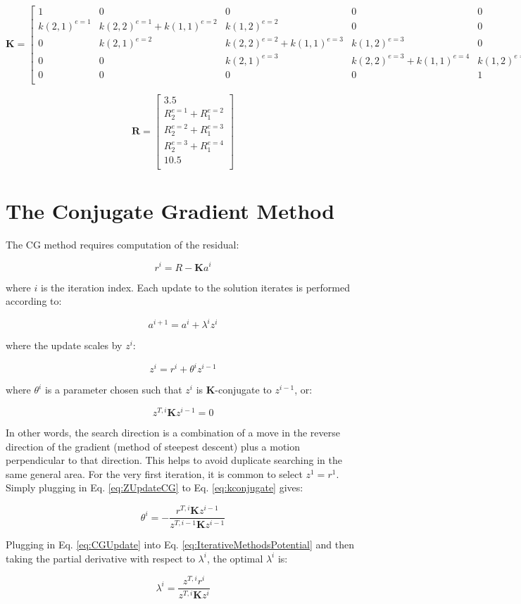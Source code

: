 \documentclass[10pt]{article}
\newcommand{\beq}{\begin{equation}}
\newcommand{\eeq}{\end{equation}}
\begin{document}
\beq
\textbf{K}=
\begin{bmatrix}
1 & 0 & 0 & 0 & 0\\
k(2, 1)^{e=1} & k(2, 2)^{e=1}+k(1, 1)^{e=2} & k(1, 2)^{e=2} & 0 & 0\\
0 & k(2, 1)^{e=2} & k(2, 2)^{e=2}+k(1, 1)^{e=3} & k(1, 2)^{e=3} & 0\\
0 & 0 & k(2, 1)^{e=3} & k(2, 2)^{e=3}+k(1, 1)^{e=4} & k(1, 2)^{e=4}\\
0 & 0 & 0 & 0 & 1\\
\end{bmatrix}
\eeq

\beq
\textbf{R}=\begin{bmatrix}
3.5\\ R_2^{e=1}+R_1^{e=2}\\R_2^{e=2}+R_1^{e=3}\\R_2^{e=3}+R_1^{e=4}\\10.5\\
\end{bmatrix}
\eeq

\section{The Conjugate Gradient Method}
The CG method requires computation of the residual:

\beq
r^i=R-\textbf{K}a^i
\eeq

where \(i\) is the iteration index. Each update to the solution iterates is performed according to:

\beq
\label{eq:CGUpdate}
a^{i+1}=a^i+\lambda^iz^i
\eeq

where the update scales by \(z^i\):

\beq
\label{eq:ZUpdateCG}
z^i=r^i+\theta^iz^{i-1}
\eeq

where \(\theta^i\) is a parameter chosen such that \(z^i\) is \(\textbf{K}\)-conjugate to \(z^{i-1}\), or:

\beq
\label{eq:kconjugate}
z^{T,i}\textbf{K}z^{i-1}=0
\eeq

In other words, the search direction is a combination of a move in the reverse direction of the gradient (method of steepest descent) plus a motion perpendicular to that direction. This helps to avoid duplicate searching in the same general area. For the very first iteration, it is common to select \(z^1=r^1\). Simply plugging in Eq. \eqref{eq:ZUpdateCG} to Eq. \eqref{eq:kconjugate} gives:

\beq
\theta^i=-\frac{r^{T,i}\textbf{K}z^{i-1}}{z^{T,i-1}\textbf{K}z^{i-1}}
\eeq

Plugging in Eq. \eqref{eq:CGUpdate} into Eq. \eqref{eq:IterativeMethodsPotential} and then taking the partial derivative with respect to \(\lambda^i\), the optimal \(\lambda^i\) is:

\beq
\label{eq:UpdateCG}
\lambda^i=\frac{z^{T,i}r^i}{z^{T,i}\textbf{K}z^i}
\eeq
\end{document}
